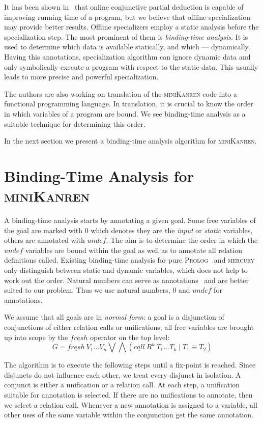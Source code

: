 \documentclass[submission,copyright,creativecommons]{eptcs}
\newcommand{\miniKanren}{\textsc{miniKanren}}
\newcommand{\prolog}{\textsc{Prolog}}
\newcommand{\mercury}{\textsc{mercury}}
\begin{document}
It has been shown in~\cite{lozov2019relational} that online conjunctive partial deduction is capable of improving running time of a program, but we believe that offline specialization may provide better results.
Offline specializers employ a static analysis before the specialization step.
The most prominent of them is \emph{binding-time analysis}.
It is used to determine which data is available statically, and which --- dynamically.
Having this annotations, specialization algorithm can ignore dynamic data and only symbolically execute a program with respect to the static data.
This usually leads to more precise and powerful specialization.

The authors are also working on translation of the \miniKanren{} code into a functional programming language.
In translation, it is crucial to know the order in which variables of a program are bound.
We see binding-time analysis as a suitable technique for determining this order.

In the next section we present a binding-time analysis algorithm for \miniKanren{}.


\section{Binding-Time Analysis for \miniKanren{}}

A binding-time analysis starts by annotating a given goal.
Some free variables of the goal are marked with $0$ which denotes they are the \emph{input} or \emph{static} variables, others are annotated with $undef$.
The aim is to determine the order in which the $undef$ variables are bound within the goal as well as to annotate all relation definitions called.
Existing binding-time analysis for pure \prolog{}~\cite{craig2004fully} and \mercury{}~\cite{vanhoof2004binding} only distinguish between static and dynamic variables, which does not help to work out the order.
Natural numbers can serve as annotations~\cite{Thiemann1997AUF} and are better suited to our problem.
Thus we use natural numbers, $0$ and $undef$ for annotations.

We assume that all goals are in \emph{normal form}: a goal is a disjunction of conjunctions of either relation calls or unifications; all free variables are brought up into scope by the $\underline{fresh}$ operator on the top level:
$$G = \underline{fresh} \ V_1 \dots V_n \bigvee \bigwedge (\underline{call} \ R^k \ T_1 \dots T_k \mid T_1 \equiv T_2)$$

The algorithm is to execute the following steps until a fix-point is reached.
Since disjuncts do not influence each other, we treat every disjunct in isolation.
A conjunct is either a unification or a relation call.
At each step, a unification suitable for annotation is selected.
If there are no unifications to annotate, then we select a relation call.
Whenever a new annotation is assigned to a variable, all other uses of the same variable within the conjunction get the same annotation.
\end{document}
